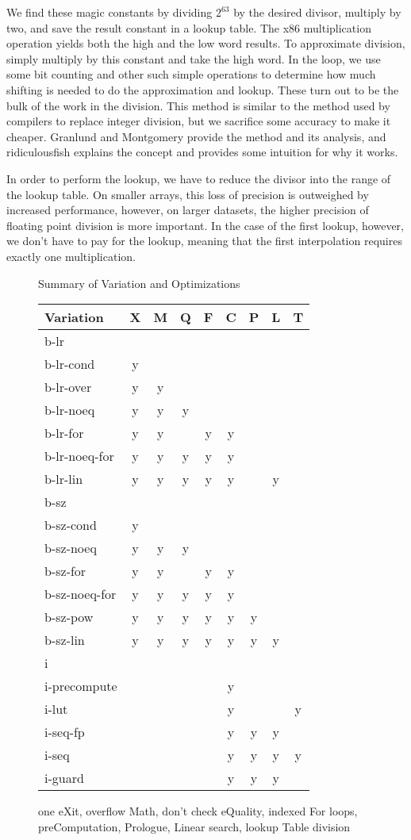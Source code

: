 \documentclass[twocolumn]{article}
\begin{document}
We find these magic constants by dividing $2^63$ by the desired divisor, multiply by two, and save the result constant in a lookup table. The x86 multiplication operation yields both the high and the low word results. To approximate division, simply multiply by this constant and take the high word. In the loop, we use some bit counting and other such simple operations to determine how much shifting is needed to do the approximation and lookup. These turn out to be the bulk of the work in the division. This method is similar to the method used by compilers to replace integer division, but we sacrifice some accuracy to make it cheaper. Granlund and Montgomery \cite{granlund-montgomery} provide the method and its analysis, and ridiculousfish \cite{fish} explains the concept and provides some intuition for why it works.

In order to perform the lookup, we have to reduce the divisor into the range of the lookup table. On smaller arrays, this loss of precision is outweighed by increased performance, however, on larger datasets, the higher precision of floating point division is more important. In the case of the first lookup, however, we don't have to pay for the lookup, meaning that the first interpolation requires exactly one multiplication.

\begin{figure}
  \caption{Summary of Variation and Optimizations}
\begin{tabular}{l*{8}c}
	Variation & X & M & Q & F & C & P & L & T \\
	\hline
	b-lr \\
	b-lr-cond & y \\
	b-lr-over & y & y \\
	b-lr-noeq & y & y & y \\
	b-lr-for & y & y & & y & y \\
	b-lr-noeq-for & y & y & y & y & y \\
	b-lr-lin & y & y & y & y & y & & y & \\

	b-sz \\
	b-sz-cond & y \\
	b-sz-noeq & y & y & y \\
	b-sz-for & y & y & & y & y \\
	b-sz-noeq-for & y & y & y & y & y \\
	b-sz-pow & y & y & y & y & y & y \\
	b-sz-lin & y & y & y & y & y & y & y & \\
	
	i \\
	i-precompute & & & & & y \\
	i-lut        & & & & & y & & & y \\
	i-seq-fp     & & & & & y & y & y \\
	i-seq        & & & & & y & y & y & y \\
	i-guard     & & & & & y & y & y \\
\end{tabular}
  \caption{one eXit, overflow Math, don't check eQuality, indexed For loops, preComputation, Prologue, Linear search, lookup Table division}
\end{figure}
	
\end{document}
